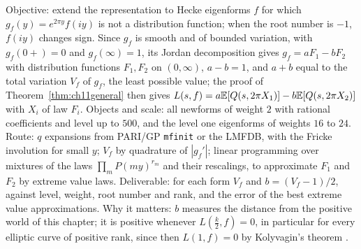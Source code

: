 \begin{compproblem}
Objective: extend the representation to Hecke eigenforms $f$ for which $g_f(y)=e^{2\pi y}f(iy)$ is not a distribution function; when the root number is $-1$, $f(iy)$ changes sign. Since $g_f$ is smooth and of bounded variation, with $g_f(0+)=0$ and $g_f(\infty)=1$, its Jordan decomposition gives $g_f=aF_1-bF_2$ with distribution functions $F_1,F_2$ on $(0,\infty)$, $a-b=1$, and $a+b$ equal to the total variation $V_f$ of $g_f$, the least possible value; the proof of Theorem~\ref{thm:ch11general} then gives $L(s,f)=a\mathbb{E}[Q(s,2\pi X_1)]-b\mathbb{E}[Q(s,2\pi X_2)]$ with $X_i$ of law $F_i$. Objects and scale: all newforms of weight $2$ with rational coefficients and level up to $500$, and the level one eigenforms of weights $16$ to $24$. Route: $q$ expansions from PARI/GP \texttt{mfinit} or the LMFDB, with the Fricke involution for small $y$; $V_f$ by quadrature of $|g_f'|$; linear programming over mixtures of the laws $\prod_mP(my)^{r_m}$ and their rescalings, to approximate $F_1$ and $F_2$ by extreme value laws. Deliverable: for each form $V_f$ and $b=(V_f-1)/2$, against level, weight, root number and rank, and the error of the best extreme value approximations. Why it matters: $b$ measures the distance from the positive world of this chapter; it is positive whenever $L(\frac k2,f)=0$, in particular for every elliptic curve of positive rank, since then $L(1,f)=0$ by Kolyvagin's theorem \cite{kolyvagin1988}.
\end{compproblem}

